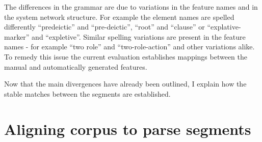             
            
            
            


    The differences in the grammar are due to variations in the feature names and in the system network structure. For example the element names are spelled differently ``predeictic'' and ``pre-deictic'', ``root'' and ``clause'' or ``explative-marker'' and ``expletive''. Similar spelling variations are present in the feature names - for example ``two role'' and ``two-role-action'' and other variations alike. To remedy this issue the current evaluation establishes mappings between the manual and automatically generated features. 

    Now that the main divergences have already been outlined, I explain how the stable matches between the segments are established.

\section{Aligning corpus to parse segments}
\label{sec:stable-marriage}
    
    

